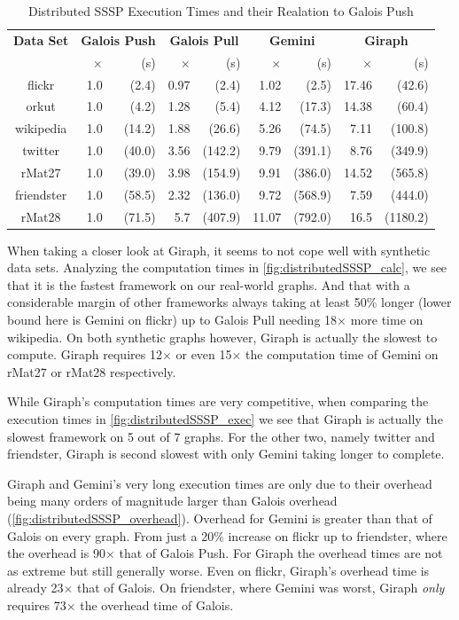 \begin{table}
\renewcommand{\arraystretch}{1.2}
\tiny
\centering
\caption{Distributed SSSP Execution Times and their Realation to Galois Push}
\begin{tabular}{crrrrrrrr}
\hline
\bf{Data Set}&
\multicolumn{2}{c}{\bf Galois Push}&\multicolumn{2}{c}{\bf Galois Pull}&\multicolumn{2}{c}{\bf Gemini}&\multicolumn{2}{c}{\bf Giraph}\\
&$\times$&(s)&$\times$&(s)&$\times$&(s)&$\times$&(s)\\\hline
flickr & 1.0 & (2.4) & 0.97 & (2.4) & 1.02 & (2.5) & 17.46 & (42.6)\\
orkut & 1.0 & (4.2) & 1.28 & (5.4) & 4.12 & (17.3) & 14.38 & (60.4)\\
wikipedia & 1.0 & (14.2) & 1.88 & (26.6) & 5.26 & (74.5) & 7.11 & (100.8) \\
twitter & 1.0 & (40.0) & 3.56 & (142.2) & 9.79 & (391.1) & 8.76 & (349.9)\\
rMat27 & 1.0 & (39.0) & 3.98 & (154.9) & 9.91 & (386.0) & 14.52 & (565.8)\\
friendster & 1.0 & (58.5) & 2.32 & (136.0) & 9.72 & (568.9) & 7.59 & (444.0)\\
rMat28 & 1.0 & (71.5) & 5.7 & (407.9) & 11.07 & (792.0) & 16.5 & (1180.2)\\\hline
\end{tabular}
\label{tbl:ssspexec}
\end{table}



When taking a closer look at Giraph, it seems to not cope well with synthetic data sets. Analyzing the computation times in \autoref{fig:distributedSSSP_calc}, we see that it is the fastest framework on our real-world graphs. And that with a considerable margin of other frameworks always taking at least 50\% longer (lower bound here is Gemini on flickr) up to Galois Pull needing 18$\times$ more time on wikipedia.
On both synthetic graphs however, Giraph is actually the slowest to compute. Giraph requires 12$\times$ or even 15$\times$ the computation time of Gemini on rMat27 or rMat28 respectively.

While Giraph's computation times are very competitive, when comparing the execution times in \autoref{fig:distributedSSSP_exec} we see that Giraph is actually the slowest framework on 5 out of 7 graphs. For the other two, namely twitter and friendster, Giraph is second slowest with only Gemini taking longer to complete.

Giraph and Gemini's very long execution times are only due to their overhead being many orders of magnitude larger than Galois overhead (\autoref{fig:distributedSSSP_overhead}).
Overhead for Gemini is greater than that of Galois on every graph. From just a 20\% increase on flickr up to friendster, where the overhead is 90$\times$ that of Galois Push.
For Giraph the overhead times are not as extreme but still generally worse. Even on flickr, Giraph's overhead time is already 23$\times$ that of Galois. On friendster, where Gemini was worst, Giraph \emph{only} requires 73$\times$ the overhead time of Galois.



